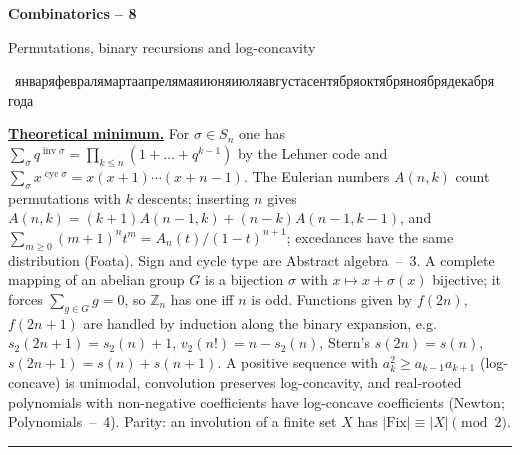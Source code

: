 \documentclass[11pt,a4paper]{article}
\newcommand{\head}[1]{\par\medskip\noindent\textbf{\underline{#1}}\quad}
\newcommand{\sheettitle}[3]{%
  \begin{center}
  {\huge\bfseries #1\par}\vspace{1.2em}
  {\Large #2\par}\vspace{0.8em}
  \if\relax\detokenize{#3}\relax\else{\Large #3\par}\vspace{0.8em}\fi
  {\rudate\par}
  \end{center}\vspace{0.5em}}
\newcommand{\rudate}{\foreignlanguage{russian}{\number\day~\ifcase\month\or января\or февраля\or марта\or апреля\or мая\or июня\or июля\or августа\or сентября\or октября\or ноября\or декабря\fi\ \number\year~года}}
\DeclareMathOperator{\inv}{inv}
\DeclareMathOperator{\cyc}{cyc}
\begin{document}
\sheettitle{Combinatorics -- 8}{Permutations, binary recursions and log-concavity}{Homework}

\head{Theoretical minimum.} For $\sigma\in S_n$ one has
$\sum_\sigma q^{\inv\sigma}=\prod_{k\leqslant n}(1+\dots+q^{k-1})$ by the Lehmer code and
$\sum_\sigma x^{\cyc\sigma}=x(x+1)\cdots(x+n-1)$. The Eulerian numbers $A(n,k)$ count
permutations with $k$ descents; inserting $n$ gives
$A(n,k)=(k+1)A(n-1,k)+(n-k)A(n-1,k-1)$, and
$\sum_{m\geqslant0}(m+1)^nt^m=A_n(t)/(1-t)^{n+1}$; excedances have the same distribution
(Foata). Sign and cycle type are Abstract algebra~--~3. A complete mapping of an abelian group $G$ is a bijection $\sigma$ with
$x\mapsto x+\sigma(x)$ bijective; it forces $\sum_{g\in G}g=0$, so $\mathbb Z_n$ has one iff
$n$ is odd. Functions given by $f(2n)$, $f(2n+1)$ are handled by induction along the binary
expansion, e.g. $s_2(2n+1)=s_2(n)+1$, $v_2(n!)=n-s_2(n)$, Stern's $s(2n)=s(n)$,
$s(2n+1)=s(n)+s(n+1)$. A positive sequence with $a_k^2\geqslant a_{k-1}a_{k+1}$ (log-concave) is
unimodal, convolution preserves log-concavity, and real-rooted polynomials with non-negative
coefficients have log-concave coefficients (Newton; Polynomials~--~4). Parity:
an involution of a finite set $X$ has $|\mathrm{Fix}|\equiv|X|\pmod2$.

\medskip\noindent\rule{\linewidth}{0.4pt}
\end{document}

